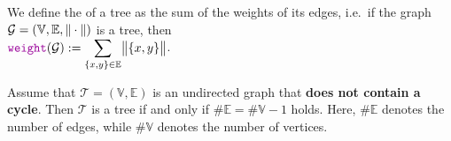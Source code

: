 \begin{Definition}
We define the  of a tree  as the sum of the weights of its edges,
i.e.~if the graph $\mathcal{G} = (\mathbb{V},\mathbb{E}, \|\cdot\|)$ is a tree, then
\\[0.2cm]
\hspace*{1.3cm}
$\ds \mytt{weight}(\mathcal{G}) := \sum\limits_{\{x,y\} \in \mathbb{E}} \Weight{\{x,y\}}$.  \eoxs
\end{Definition}

\begin{Proposition}
  Assume that $\mathcal{T} = (\mathbb{V},\mathbb{E})$ is an undirected graph that \textbf{does not contain a cycle}.
  Then $\mathcal{T}$ is a tree if and only if $\#\mathbb{E} = \#\mathbb{V} - 1$ holds.  Here, $\#\mathbb{E}$ denotes the number of edges,
  while $\#\mathbb{V}$ denotes the number of vertices.  
\end{Proposition}

